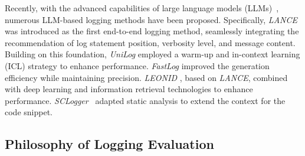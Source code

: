Recently, with the advanced capabilities of large language models (LLMs)~\cite{Floridi2020GPT3IN, raffel2020exploring}, numerous LLM-based logging methods have been proposed. 
Specifically, \textit{LANCE}~\cite{Mastropaolo2022UsingDL} was introduced as the first end-to-end logging method, seamlessly integrating the recommendation of log statement position, verbosity level, and message content.
Building on this foundation, \textit{UniLog} \cite{Xu2024UniLogAL} employed a warm-up and in-context learning (ICL) strategy to enhance performance. 
\textit{FastLog} \cite{xie2024fastlog} improved the generation efficiency while maintaining precision. 
\textit{LEONID} \cite{Mastropaolo2023LogSG}, based on \textit{LANCE}, combined with deep learning and information retrieval technologies to enhance performance. \textit{SCLogger}~\cite{Li2024GoSC} adapted static analysis to extend the context for the code snippet.

    


\subsection{Philosophy of Logging Evaluation}\label{sec:phy}


